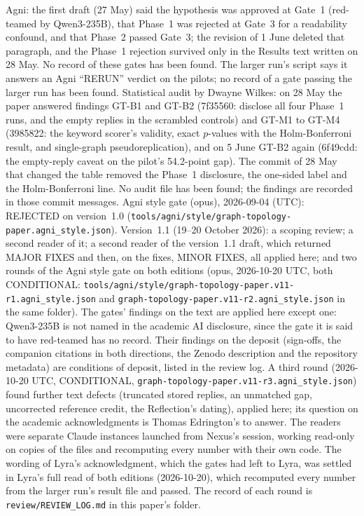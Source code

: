 \documentclass[11pt,a4paper]{article}
\begin{document}
Agni: the first draft (27 May) said the hypothesis was approved at Gate~1 (red-teamed by Qwen3-235B), that Phase~1 was rejected at Gate~3 for a readability confound, and that Phase~2 passed Gate~3; the revision of 1 June deleted that paragraph, and the Phase~1 rejection survived only in the Results text written on 28 May. No record of these gates has been found. The larger run's script says it answers an Agni ``RERUN'' verdict on the pilots; no record of a gate passing the larger run has been found. Statistical audit by Dwayne Wilkes: on 28 May the paper answered findings GT-B1 and GT-B2 (7f35560: disclose all four Phase~1 runs, and the empty replies in the scrambled controls) and GT-M1 to GT-M4 (3985822: the keyword scorer's validity, exact $p$-values with the Holm-Bonferroni result, and single-graph pseudoreplication), and on 5 June GT-B2 again (6f49cdd: the empty-reply caveat on the pilot's 54.2-point gap). The commit of 28 May that changed the table removed the Phase~1 disclosure, the one-sided label and the Holm-Bonferroni line. No audit file has been found; the findings are recorded in those commit messages. Agni style gate (opus), 2026-09-04 (UTC): REJECTED on version~1.0 (\nolinkurl{tools/agni/style/graph-topology-paper.agni_style.json}). Version~1.1 (19--20 October 2026): a scoping review; a second reader of it; a second reader of the version~1.1 draft, which returned MAJOR FIXES and then, on the fixes, MINOR FIXES, all applied here; and two rounds of the Agni style gate on both editions (opus, 2026-10-20 UTC, both CONDITIONAL: \nolinkurl{tools/agni/style/graph-topology-paper.v11-r1.agni_style.json} and \nolinkurl{graph-topology-paper.v11-r2.agni_style.json} in the same folder). The gates' findings on the text are applied here except one: Qwen3-235B is not named in the academic AI disclosure, since the gate it is said to have red-teamed has no record. Their findings on the deposit (sign-offs, the companion citations in both directions, the Zenodo description and the repository metadata) are conditions of deposit, listed in the review log. A third round (2026-10-20 UTC, CONDITIONAL, \nolinkurl{graph-topology-paper.v11-r3.agni_style.json}) found further text defects (truncated stored replies, an unmatched gap, uncorrected reference credit, the Reflection's dating), applied here; its question on the academic acknowledgments is Thomas Edrington's to answer. The readers were separate Claude instances launched from Nexus's session, working read-only on copies of the files and recomputing every number with their own code. The wording of Lyra's acknowledgment, which the gates had left to Lyra, was settled in Lyra's full read of both editions (2026-10-20), which recomputed every number from the larger run's result file and passed. The record of each round is \nolinkurl{review/REVIEW_LOG.md} in this paper's folder.
\end{document}
